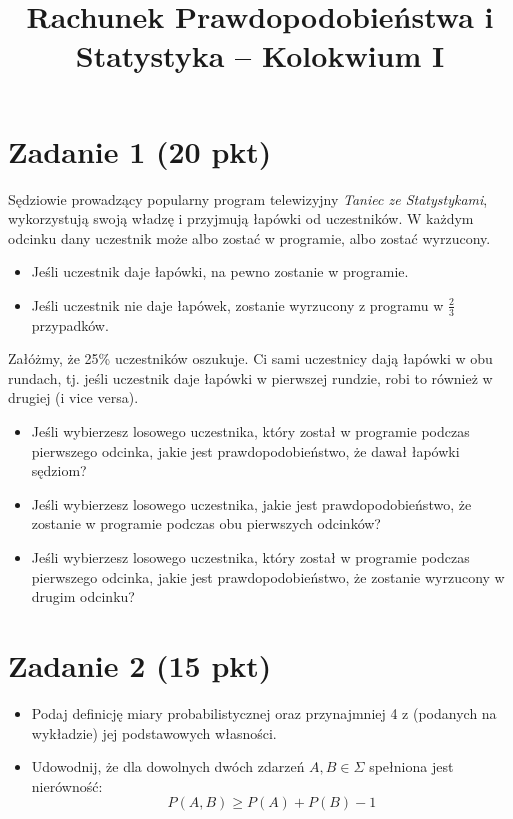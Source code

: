 \documentclass[polish, 10pt]{extarticle}
\begin{document}
\title{Rachunek Prawdopodobieństwa i Statystyka -- Kolokwium I}
\author{}
\date{}

\maketitle
\vspace{-2cm}

\section*{Zadanie 1 (20 pkt)}
Sędziowie prowadzący popularny program telewizyjny \textit{Taniec ze Statystykami}, wykorzystują swoją władzę i przyjmują łapówki od uczestników. W każdym odcinku dany uczestnik może albo zostać w programie, albo zostać wyrzucony.
\begin{itemize}
\item Jeśli uczestnik daje łapówki, na pewno zostanie w programie.
\item Jeśli uczestnik nie daje łapówek, zostanie wyrzucony z programu w $\frac{2}{3}$ przypadków.
\end{itemize}
Załóżmy, że 25\% uczestników oszukuje. Ci sami uczestnicy dają łapówki w obu rundach, tj. jeśli uczestnik daje łapówki w pierwszej rundzie, robi to również w drugiej (i vice versa).
\begin{itemize}
\item[a)] Jeśli wybierzesz losowego uczestnika, który został w programie podczas pierwszego odcinka, jakie jest prawdopodobieństwo, że dawał łapówki sędziom?
\item[b)] Jeśli wybierzesz losowego uczestnika, jakie jest prawdopodobieństwo, że zostanie w programie podczas obu pierwszych odcinków?
\item[c)] Jeśli wybierzesz losowego uczestnika, który został w programie podczas pierwszego odcinka, jakie jest prawdopodobieństwo, że zostanie wyrzucony w drugim odcinku?
\end{itemize}

\section*{Zadanie 2 (15 pkt)}
\begin{itemize} 
\item Podaj definicję miary probabilistycznej oraz przynajmniej 4 z (podanych na wykładzie) jej podstawowych własności.
\item Udowodnij, że dla dowolnych dwóch zdarzeń $A, B \in \Sigma$ spełniona jest nierówność:
$$ P(A, B) \geq P(A) + P(B) - 1 $$
\end{itemize}
\end{document}
